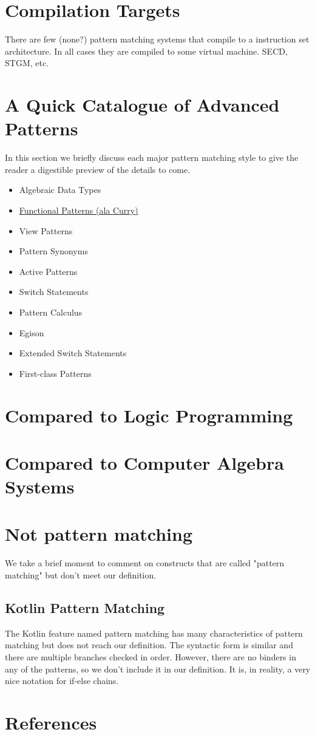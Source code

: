 \documentclass[acmsmall]{acmart}
\begin{document}
\section{Compilation Targets}
There are few (none?) pattern matching systems that compile to a instruction set architecture.  In all cases they are compiled to some virtual machine.  SECD, STGM, etc.

\section{A Quick Catalogue of Advanced Patterns}
In this section we briefly discuss each major pattern matching style to give the reader a digestible preview of the details to come.
\begin{itemize}
    \item Algebraic Data Types
    \item \href{https://link.springer.com/chapter/10.1007%2F11680093_2}{Functional Patterns (ala Curry)}
    \item View Patterns
    \item Pattern Synonyms
    \item Active Patterns
    \item Switch Statements
    \item Pattern Calculus
    \item Egison
    \item Extended Switch Statements
    \item First-class Patterns
\end{itemize}

\section{Compared to Logic Programming}

\section{Compared to Computer Algebra Systems}

\section{Not pattern matching}
We take a brief moment to comment on constructs that are called "pattern matching" but don't meet our definition.

\subsection{Kotlin Pattern Matching}
The Kotlin feature named pattern matching has many characteristics of pattern matching but does not reach our definition.  The syntactic form is similar and there are multiple branches checked in order.  However, there are no binders in any of the patterns, so we don't include it in our definition.  It is, in reality, a very nice notation for if-else chains.

\section{References}
 


\end{document}
